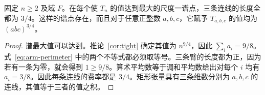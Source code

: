 \begin{corollary}\label{cor:extremal-price}
固定 \(n\ge2\) 及域 \(F\)。在每个使 \(T_n\) 的值达到最大的尺度一谱点，三条连线的长度全都为 \(3/4\)。这样的谱点存在，而且对于任意正整数 \(a,b,c\)，它赋予 \(T_{a,b,c}\) 的值均为 \((abc)^{3/4}\)。
\end{corollary}

\begin{proof}
谱最大值可以达到。推论~\ref{cor:tight} 确定其值为 \(n^{9/4}\)，因此 \(\sum_i a_i=9/8\)。式~\eqref{eq:arm-perimeter} 中的两个不等式都必须取等号。三条臂的长度都为正，因为若有一条为零，就会得到 \(1\ge9/8\)。算术平均数等于调和平均数给出对每个 \(i\) 均有 \(a_i=3/8\)。因此每条连线的费率都是 \(3/4\)。矩形张量具有三条维数分别为 \(a,b,c\) 的连线，其值等于三者的值之积。
\end{proof}
